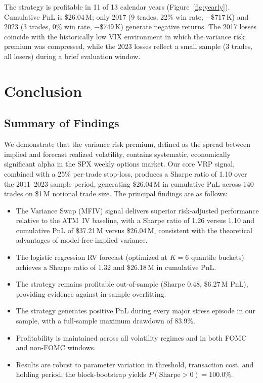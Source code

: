 \documentclass[11pt,a4paper]{article}
\begin{document}
The strategy is profitable in 11 of 13 calendar years (Figure~\ref{fig:yearly}).
Cumulative PnL is \$26.04\,M; only 2017 (9 trades, 22\% win rate, $-$\$717\,K) and 2023 (3 trades, 0\% win rate, $-$\$749\,K) generate negative returns.
The 2017 losses coincide with the historically low VIX environment in which the variance risk premium was compressed, while the 2023 losses reflect a small sample (3 trades, all losers) during a brief evaluation window.


\section{Conclusion}

\subsection{Summary of Findings}

We demonstrate that the variance risk premium, defined as the spread between implied and forecast realized volatility, contains systematic, economically significant alpha in the SPX weekly options market.
Our core VRP signal, combined with a 25\% per-trade stop-loss, produces a Sharpe ratio of 1.10 over the 2011--2023 sample period, generating \$26.04\,M in cumulative PnL across 140 trades on \$1\,M notional trade size.
The principal findings are as follows:
\begin{itemize}[nosep]
    \item The Variance Swap (MFIV) signal delivers superior risk-adjusted performance relative to the ATM~IV baseline, with a Sharpe ratio of 1.26 versus 1.10 and cumulative PnL of \$37.21\,M versus \$26.04\,M, consistent with the theoretical advantages of model-free implied variance.
    \item The logistic regression RV forecast (optimized at $K{=}6$ quantile buckets) achieves a Sharpe ratio of 1.32 and \$26.18\,M in cumulative PnL.
    \item The strategy remains profitable out-of-sample (Sharpe 0.48, \$6.27\,M PnL), providing evidence against in-sample overfitting.
    \item The strategy generates positive PnL during every major stress episode in our sample, with a full-sample maximum drawdown of 83.9\%.
    \item Profitability is maintained across all volatility regimes and in both FOMC and non-FOMC windows.
    \item Results are robust to parameter variation in threshold, transaction cost, and holding period; the block-bootstrap yields $P(\text{Sharpe} > 0) = 100.0\%$.
\end{itemize}
\end{document}
